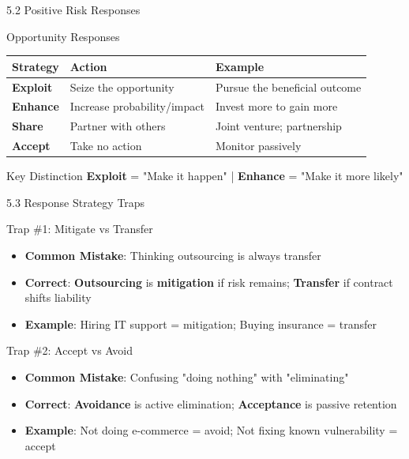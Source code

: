 \documentclass{beamer}
\begin{document}
	\begin{frame}{5.2 Positive Risk Responses}
		\begin{block}{Opportunity Responses}
			\begin{tabular}{|p{2.5cm}|p{4cm}|p{5cm}|}
				\hline
				\textbf{Strategy} & \textbf{Action} & \textbf{Example} \\
				\hline
				\textbf{Exploit} & Seize the opportunity & Pursue the beneficial outcome \\
				\hline
				\textbf{Enhance} & Increase probability/impact & Invest more to gain more \\
				\hline
				\textbf{Share} & Partner with others & Joint venture; partnership \\
				\hline
				\textbf{Accept} & Take no action & Monitor passively \\
				\hline
			\end{tabular}
		\end{block}
		
		\begin{exampleblock}{Key Distinction}
			\textbf{Exploit} = "Make it happen" | \textbf{Enhance} = "Make it more likely"
		\end{exampleblock}
	\end{frame}
	
	\begin{frame}{5.3 Response Strategy Traps}
		\begin{block}{Trap \#1: Mitigate vs Transfer}
			\begin{itemize}
				\item \textbf{Common Mistake}: Thinking outsourcing is always transfer
				\item \textbf{Correct}: \textbf{Outsourcing} is \textbf{mitigation} if risk remains; \textbf{Transfer} if contract shifts liability
				\item \textbf{Example}: Hiring IT support = mitigation; Buying insurance = transfer
			\end{itemize}
		\end{block}
		
		\begin{block}{Trap \#2: Accept vs Avoid}
			\begin{itemize}
				\item \textbf{Common Mistake}: Confusing "doing nothing" with "eliminating"
				\item \textbf{Correct}: \textbf{Avoidance} is active elimination; \textbf{Acceptance} is passive retention
				\item \textbf{Example}: Not doing e-commerce = avoid; Not fixing known vulnerability = accept
			\end{itemize}
		\end{block}
	\end{frame}
	
\end{document}
